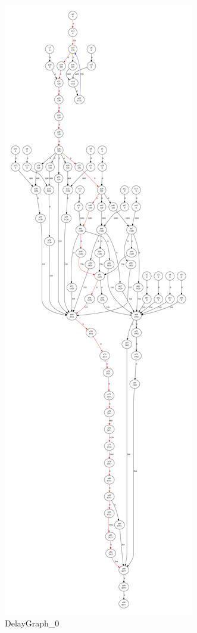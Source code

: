 \begin{figure}[p]
	\centering
		\includegraphics[width=\textwidth,height=.9\textheight,keepaspectratio]{graph0.pdf}
	\caption{DelayGraph\_0}
	\label{fig:graph0}
\end{figure}

